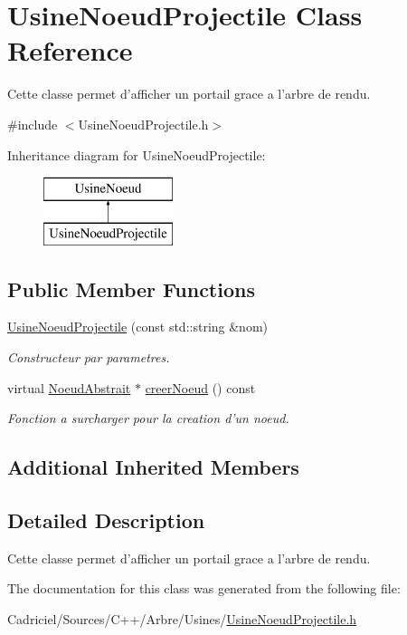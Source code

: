 \hypertarget{class_usine_noeud_projectile}{\section{Usine\-Noeud\-Projectile Class Reference}
\label{class_usine_noeud_projectile}
}


Cette classe permet d'afficher un portail grace a l'arbre de rendu.  




{\ttfamily \#include $<$Usine\-Noeud\-Projectile.\-h$>$}

Inheritance diagram for Usine\-Noeud\-Projectile\-:\begin{figure}[H]
\begin{center}
\leavevmode
\includegraphics[height=2.000000cm]{class_usine_noeud_projectile}
\end{center}
\end{figure}
\subsection*{Public Member Functions}
\begin{DoxyCompactItemize}
\item 
\hyperlink{group__inf2990_gaa99dfe6188de9eb3f79824d8c5fed24c}{Usine\-Noeud\-Projectile} (const std\-::string \&nom)
\begin{DoxyCompactList}\small\item\em Constructeur par parametres. \end{DoxyCompactList}\item 
virtual \hyperlink{class_noeud_abstrait}{Noeud\-Abstrait} $\ast$ \hyperlink{group__inf2990_ga1e14780d2df909be0a7cf5c6b64897bd}{creer\-Noeud} () const 
\begin{DoxyCompactList}\small\item\em Fonction a surcharger pour la creation d'un noeud. \end{DoxyCompactList}\end{DoxyCompactItemize}
\subsection*{Additional Inherited Members}


\subsection{Detailed Description}
Cette classe permet d'afficher un portail grace a l'arbre de rendu. 

The documentation for this class was generated from the following file\-:\begin{DoxyCompactItemize}
\item 
Cadriciel/\-Sources/\-C++/\-Arbre/\-Usines/\hyperlink{_usine_noeud_projectile_8h}{Usine\-Noeud\-Projectile.\-h}\end{DoxyCompactItemize}
